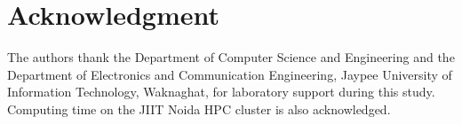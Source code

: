 \section*{Acknowledgment}
The authors thank the Department of Computer Science and Engineering and the Department of Electronics and Communication Engineering, Jaypee University of Information Technology, Waknaghat, for laboratory support during this study. Computing time on the JIIT Noida HPC cluster is also acknowledged.

